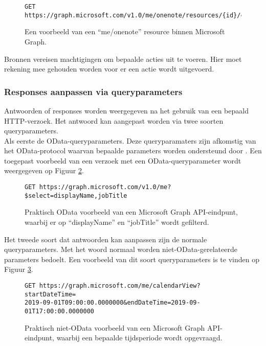 \begin{figure}[h]
    \scriptsize
    \begin{verbatim}
GET https://graph.microsoft.com/v1.0/me/onenote/resources/{id}/content
    \end{verbatim}    
    \caption[Voorbeeld Microsoft Graph resource]{Een voorbeeld van een “me/onenote” resource binnen Microsoft Graph.}
    \label{MSGR}
\end{figure}

Bronnen vereisen machtigingen om bepaalde acties uit te voeren. Hier moet rekening mee gehouden worden voor er een actie wordt uitgevoerd.

\subsubsection{Responses aanpassen via queryparameters}

Antwoorden of responses worden weergegeven na het gebruik van een bepaald HTTP-verzoek. Het antwoord kan aangepast worden via twee soorten queryparameters. \\

Als eerste de OData-queryparameters. Deze queryparamaters zijn afkomstig van het OData-protocol waarvan bepaalde parameters worden ondersteund door \textcite{Microsoft2023g}. Een toegepast voorbeeld van een verzoek met een OData-queryparameter wordt weergegeven op Figuur \ref{TRAM}. \\

\begin{figure}[h]
    \scriptsize
    \begin{verbatim}
GET https://graph.microsoft.com/v1.0/me?$select=displayName,jobTitle
    \end{verbatim}    
    \caption[Voorbeeld OData HTTP-verzoek]{Praktisch OData voorbeeld van een Microsoft Graph \Ac{API}-eindpunt, waarbij er op “displayName” en “jobTitle” wordt gefilterd.}
    \label{TRAM}
\end{figure}

Het tweede soort dat antwoorden kan aanpassen zijn de normale queryparameters. Met het woord normaal worden niet-OData-gerelateerde parameters bedoelt. Een voorbeeld van dit soort queryparameters is te vinden op Figuur \ref{NRAM}. \\

\begin{figure}[h]
    \scriptsize\begin{verbatim}
GET https://graph.microsoft.com/me/calendarView?startDateTime=
2019-09-01T09:00:00.0000000&endDateTime=2019-09-01T17:00:00.0000000
    \end{verbatim}    
    \caption[Voorbeeld niet-OData HTTP-verzoek]{Praktisch niet-OData voorbeeld van een Microsoft Graph \Ac{API}-eindpunt, waarbij een bepaalde tijdsperiode wordt opgevraagd.}
    \label{NRAM}
\end{figure}

